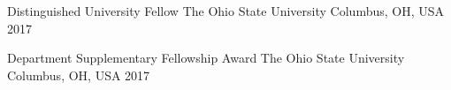 



\begin{cvhonors}

  \cvhonor
    {Distinguished University Fellow} %
    {The Ohio State University} %
    {Columbus, OH, USA} %
    {2017} %

  \cvhonor
    {Department Supplementary Fellowship Award } %
    {The Ohio State University} %
    {Columbus, OH, USA} %
    {2017} %

\end{cvhonors}




